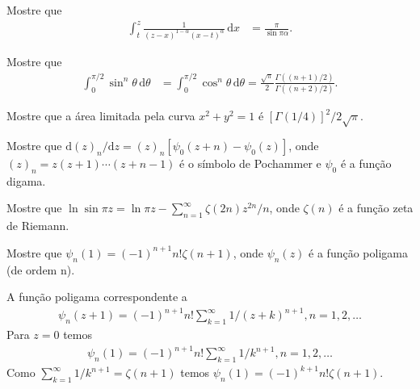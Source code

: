 \documentclass[a4paper,12pt, leqno, answers]{exam}
\begin{document}
\begin{questions}
    \question Mostre que
    \begin{align*}
        \int_t^z \frac{1}{\left( z - x \right)^{1 - \alpha} \left( x - t \right)^{\alpha}} \,\mathrm{d}x &= \frac{\pi}{\sin \pi \alpha}.
    \end{align*}
    \begin{solution}
    \end{solution}

    \question Mostre que
    \begin{align*}
        \int_0^{\pi/2} \sin^n \theta \,\mathrm{d}\theta &= \int_0^{\pi/2} \cos^n \theta \,\mathrm{d}\theta = \frac{\sqrt{\pi}}{2} \frac{\Gamma\left( (n + 1) / 2 \right)}{\Gamma\left( (n + 2) / 2 \right)}.
    \end{align*}
    \begin{solution}
    \end{solution}

    \question Mostre que a \'{a}rea limitada pela curva $x^2 + y^2 = 1$ \'{e} $\left[ \Gamma(1/4) \right]^2 / 2 \sqrt{\pi}$.
    \begin{solution}
    \end{solution}

    \question Mostre que $\mathrm{d} \left( z \right)_n / \mathrm{d} z = \left( z \right)_n \left[ \psi_0 \left( z + n \right) - \psi_0\left( z \right) \right]$, onde $\left( z \right)_n = z \left( z + 1 \right) \cdots \left( z + n - 1 \right)$ \'{e} o s\'{i}mbolo de Pochammer e $\psi_0$ \'{e} a fun\c{c}\~{a}o digama.
    \begin{solution}
    \end{solution}

    \question Mostre que $\ln \sin \pi z = \ln \pi z - \sum_{n = 1}^\infty \zeta(2n) z^{2n} / n$, onde $\zeta(n)$ \'{e} a fun\c{c}\~{a}o zeta de Riemann.
    \begin{solution}
    \end{solution}

    \question Mostre que $\psi_n(1) = \left( -1 \right)^{n + 1} n! \zeta(n + 1)$, onde $\psi_n(z)$ \'{e} a fun\c{c}\~{a}o poligama (de ordem n).
    \begin{solution}
        A fun\c{c}\~{a}o poligama correspondente a
        \begin{align*}
            \psi_n(z + 1) = (-1)^{n + 1} n! \sum_{k = 1}^\infty 1/(z + k)^{n + 1}, n = 1, 2, \ldots
        \end{align*}
        Para $z = 0$ temos
        \begin{align*}
            \psi_n(1) = (-1)^{n + 1}n ! \sum_{k = 1}^\infty 1/k^{n + 1}, n = 1, 2, \ldots
        \end{align*}
        Como $\sum_{k = 1}^\infty 1/k^{n + 1} = \zeta(n + 1)$ temos $\psi_n(1) = (-1)^{k + 1} n! \zeta(n + 1)$.
    \end{solution}


\end{questions}
\end{document}

